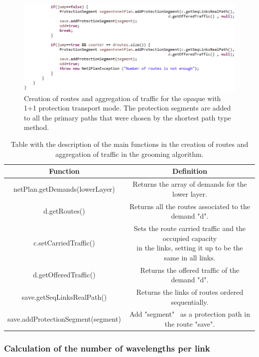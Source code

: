 \begin{figure}[H]
\centering
\includegraphics[width=14cm]{sdf/heuristic/opaque_protection/figures/grooming_opaque_protec2}
\caption{Creation of routes and aggregation of traffic for the opaque with 1+1 protection transport mode. The protection segments are added to all the primary paths that were chosen by the shortest path type method.}
\label{grooming_opaque_protec2}
\end{figure}

\begin{table}[H]
\centering
\begin{tabular}{|| c | c ||}
 \hline
 Function & Definition \\
 \hline\hline
 netPlan.getDemands(lowerLayer) & Returns the array of demands for the lower layer. \\
 \hline
 d.getRoutes() & Returns all the routes associated to the demand "d". \\
 \hline
 c.setCarriedTraffic() & \makecell{Sets the route carried traffic and the occupied capacity\\in the links, setting it up to be the same in all links.} \\
 \hline
 d.getOfferedTraffic() & Returns the offered traffic of the demand "d". \\
 \hline
 save.getSeqLinksRealPath() & Returns the links of routes ordered sequentially. \\
 \hline
 save.addProtectionSegment(segment) & Add "segment" \ as a protection path in the route "save". \\
 \hline
\end{tabular}
\caption{Table with the description of the main functions in the creation of routes and aggregation of traffic in the grooming algorithm.}
\label{grooming_table_variables_opaque_protec}
\end{table}

\subsubsection{Calculation of the number of wavelengths per link}

